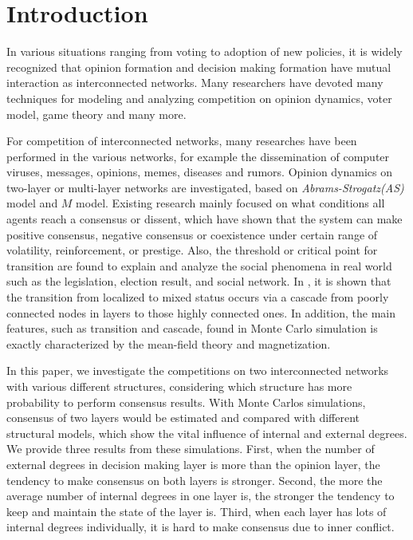 \documentclass[english]{cccconf}
\begin{document}
\section{Introduction}
In various situations ranging from voting to adoption of new policies, it is widely recognized that opinion formation and decision making formation have mutual interaction as interconnected networks\cite{bianconi2018,domenico2013,tomasini2015, kimsangwoo2012,newman2010,boccaletti2014,mikko2013,huberman2004}. Many researchers have devoted many techniques for modeling and analyzing competition on opinion dynamics\cite{amato2017,quattrociocchi2014,haibo2017, hua2014}, voter model\cite{redner2017}, game theory\cite{smyrnakis2019} and many more\cite{danziger2019,namkhanhvu2017,laguna2004,masuda2015,zuev2012, shenyu2018}.  
 
For competition of interconnected networks, many researches have been performed in the various networks, for example the dissemination of computer viruses, messages, opinions, memes, diseases and rumors\cite{hua2014,shenyu2018,alvarez2016,gomez2015,diep2017,rocca2014,velasquez2018}. Opinion dynamics on two-layer or multi-layer networks are investigated, based on \textit{Abrams-Strogatz(AS)} model\cite{abrams2003,vazquez2010} and $M$ model\cite{rocca2014}. Existing research mainly focused on what conditions all agents reach a consensus or dissent, which have shown that the system can make positive consensus, negative consensus or coexistence under certain range of volatility, reinforcement, or prestige. Also, the threshold or critical point for transition are found to explain and analyze the social phenomena in real world such as the legislation, election result, and social network\cite{alvarez2016, amato2017, diep2017}. In \cite{gomez2015}, it is shown that the transition from localized to mixed status occurs via a cascade from poorly connected nodes in layers to those highly connected ones. In addition, the main features, such as transition and cascade, found in Monte Carlo simulation is exactly characterized by the mean-field theory and magnetization\cite{alvarez2016, diep2017, amato2017, gomez2015}.   

In this paper, we investigate the competitions on two interconnected networks with various different structures, considering which structure has more probability to perform consensus results. With Monte Carlos simulations, consensus of two layers would be estimated and compared with different structural models, which show the vital influence of internal and external degrees. We provide three results from these simulations. First, when the number of external degrees in decision making layer is more than the opinion layer, the tendency to make consensus on both layers is stronger. Second, the more the average number of internal degrees in one layer is, the stronger the tendency to keep and maintain the state of the layer is. Third, when each layer has lots of internal degrees individually, it is hard to make consensus due to inner conflict.    
\end{document}
